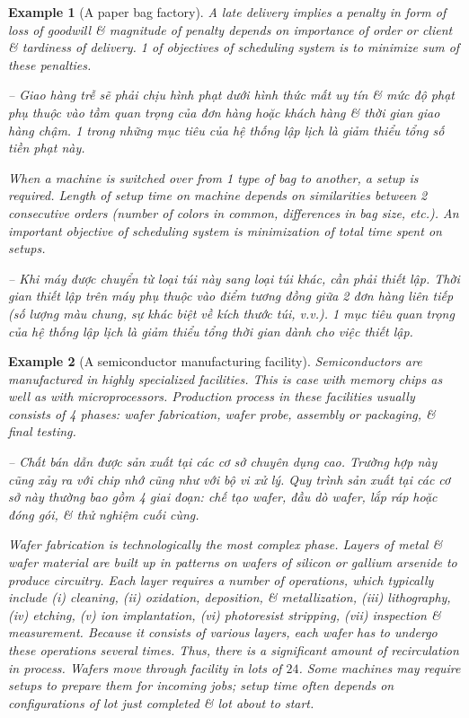 \documentclass{article}
\newtheorem{example}{Example}
\begin{document}
\begin{itemize}
\begin{itemize}
\begin{example}[A paper bag factory]
            A late delivery implies a penalty in form of loss of goodwill \& magnitude of penalty depends on importance of order or client \& tardiness of delivery. 1 of objectives of scheduling system is to minimize sum of these penalties.

            -- Giao hàng trễ sẽ phải chịu hình phạt dưới hình thức mất uy tín \& mức độ phạt phụ thuộc vào tầm quan trọng của đơn hàng hoặc khách hàng \& thời gian giao hàng chậm. 1 trong những mục tiêu của hệ thống lập lịch là giảm thiểu tổng số tiền phạt này.

            When a machine is switched over from 1 type of bag to another, a setup is required. Length of setup time on machine depends on similarities between 2 consecutive orders (number of colors in common, differences in bag size, etc.). An important objective of scheduling system is minimization of total time spent on setups.

            -- Khi máy được chuyển từ loại túi này sang loại túi khác, cần phải thiết lập. Thời gian thiết lập trên máy phụ thuộc vào điểm tương đồng giữa 2 đơn hàng liên tiếp (số lượng màu chung, sự khác biệt về kích thước túi, v.v.). 1 mục tiêu quan trọng của hệ thống lập lịch là giảm thiểu tổng thời gian dành cho việc thiết lập.
        \end{example}

        \begin{example}[A semiconductor manufacturing facility]
            Semiconductors are manufactured in highly specialized facilities. This is case with memory chips as well as with microprocessors. Production process in these facilities usually consists of 4 phases: wafer fabrication, wafer probe, assembly or packaging, \& final testing.

            -- Chất bán dẫn được sản xuất tại các cơ sở chuyên dụng cao. Trường hợp này cũng xảy ra với chip nhớ cũng như với bộ vi xử lý. Quy trình sản xuất tại các cơ sở này thường bao gồm 4 giai đoạn: chế tạo wafer, đầu dò wafer, lắp ráp hoặc đóng gói, \& thử nghiệm cuối cùng.

            Wafer fabrication is technologically the most complex phase. Layers of metal \& wafer material are built up in patterns on wafers of silicon or gallium arsenide to produce circuitry. Each layer requires a number of operations, which typically include (i) cleaning, (ii) oxidation, deposition, \& metallization, (iii) lithography, (iv) etching, (v) ion implantation, (vi) photoresist stripping, (vii) inspection \& measurement. Because it consists of various layers, each wafer has to undergo these operations several times. Thus, there is a significant amount of recirculation in process. Wafers move through facility in lots of $24$. Some machines may require setups to prepare them for incoming jobs; setup time often depends on configurations of lot just completed \& lot about to start.


\end{example}
\end{itemize}
\end{itemize}
\end{document}
